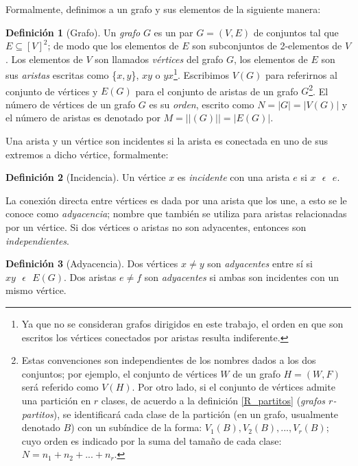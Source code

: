 \documentclass[letterpaper, 11pt]{book}
\theoremstyle{definition}
\newtheorem{definition}{Definición}[chapter]
\theoremstyle{remark}
\begin{document}
Formalmente, definimos a un grafo y sus elementos de la siguiente manera:
\begin{definition}[Grafo]
\label{Grafo}
    Un \emph{grafo} $ G$ es un par $G = (V,E)$ de conjuntos tal que $E \subseteq [V]^{2}$; de modo que los elementos de $E$ son subconjuntos de 2-elementos de $V$. Los elementos de $V$ son llamados \emph{vértices}  del grafo $G$, los elementos de $E$ son sus \emph{aristas} escritas como \{$x,y$\}, $xy$ o $yx$\footnote{
	Ya que no se consideran grafos dirigidos en este trabajo, el orden en que son escritos los vértices conectados por aristas resulta indiferente.
    }. 
    Escribimos $V(G)$ para referirnos al conjunto de vértices y $E(G)$ para el conjunto de aristas de un grafo $G$\footnote{
	Estas convenciones son independientes de los nombres dados a los dos conjuntos; por ejemplo, el conjunto de vértices $W$ de un grafo $H = (W,F)$ será referido como $V(H)$.
	Por otro lado, si el conjunto de vértices admite una partición en $r$ clases, de acuerdo a la definición \ref{R_partitos} (\emph{grafos $r$-partitos}), se identificará cada clase de la partición (en un grafo, usualmente denotado $B$) con un subíndice de la forma: $V_{1}(B), V_{2}(B),..., V_{r}(B)$; cuyo orden es indicado por la suma del tamaño de cada clase: $N=n_{1}+n_{2}+...+n_{r}$.
    }. El número de vértices de un grafo $G$ es su \emph{orden}, escrito como $N = |G|=|V(G)|$ y el número de aristas es denotado por $M = ||(G)||=|E(G)|$.
\end{definition}

Una arista y un vértice son incidentes si la arista es conectada en uno de sus extremos a dicho vértice, formalmente:
\begin{definition}[Incidencia]
\label{Incidencia}
	Un vértice $x$ es \emph{incidente} con una arista $e$ si $x \text{ } \epsilon \text{ } e$.
\end{definition}

La conexión directa entre vértices es dada por una arista que los une, a esto se le conoce como \emph{adyacencia}; nombre que también se utiliza para aristas relacionadas por un vértice. Si dos vértices o aristas no son adyacentes, entonces son \emph{independientes}.
\begin{definition}[Adyacencia]
\label{Adyacencia}
	Dos vértices $x \neq y$ son \emph{adyacentes} entre sí si $xy \text{ } \epsilon \text{ } E(G)$. Dos aristas $e \neq f$ son \emph{adyacentes} si ambas son incidentes con un mismo vértice.
\end{definition}
\end{document}
